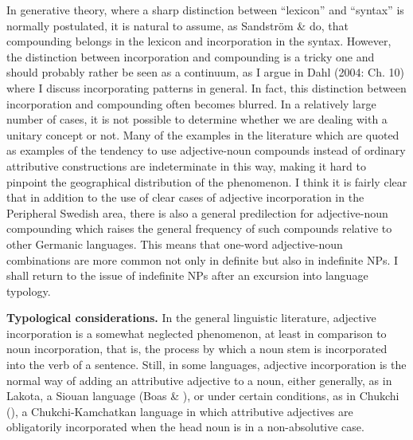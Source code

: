 
In generative theory, where a sharp distinction between “lexicon” and “syntax” is normally postulated, it is natural to assume, as Sandström \& \citet{Holmberg2003} do, that compounding belongs in the lexicon and incorporation in the syntax. However, the distinction between incorporation and compounding is a tricky one and should probably rather be seen as a continuum, as I argue in Dahl (2004: Ch. 10) where I discuss incorporating patterns in general. In fact, this distinction between incorporation and compounding often becomes blurred. In a relatively large number of cases, it is not possible to determine whether we are dealing with a unitary concept or not. Many of the examples in the literature which are quoted as examples of the tendency to use adjective-noun compounds instead of ordinary attributive constructions are indeterminate in this way, making it hard to pinpoint the geographical distribution of the phenomenon. I think it is fairly clear that in addition to the use of clear cases of adjective incorporation in the Peripheral Swedish area, there is also a general predilection for adjective-noun compounding which raises the general frequency of such compounds relative to other Germanic languages. This means that one-word adjective-noun combinations are more common not only in definite but also in indefinite NPs. I shall return to the issue of indefinite NPs after an excursion into language typology.


\textbf{Typological considerations.} In the general linguistic literature, adjective incorporation is a somewhat neglected phenomenon, at least in comparison to noun incorporation, that is, the process by which a noun stem is incorporated into the verb of a sentence. Still, in some languages, adjective incorporation is the normal way of adding an attributive adjective to a noun, either generally, as in Lakota, a Siouan language (Boas \& \citet{Deloria1941}), or under certain conditions, as in Chukchi (\citet[526]{Muravyova1998}), a Chukchi-Kamchatkan language in which attributive adjectives are obligatorily incorporated when the head noun is in a non-absolutive case.


